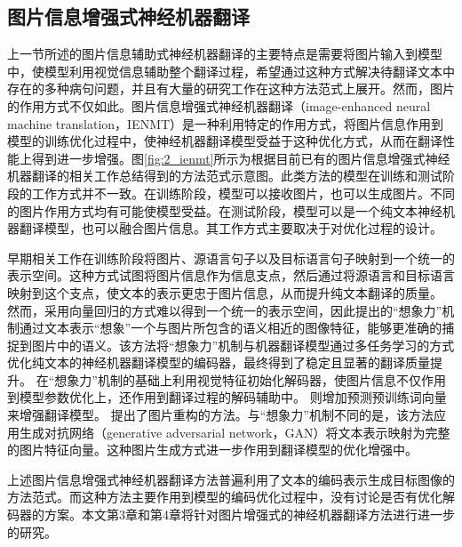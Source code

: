 \subsection{图片信息增强式神经机器翻译}

上一节所述的图片信息辅助式神经机器翻译的主要特点是需要将图片输入到模型中，使模型利用视觉信息辅助整个翻译过程，希望通过这种方式解决待翻译文本中存在的多种病句问题，并且有大量的研究工作在这种方法范式上展开。然而，图片的作用方式不仅如此。图片信息增强式神经机器翻译（image-enhanced neural machine translation，IENMT）是一种利用特定的作用方式，将图片信息作用到模型的训练优化过程中，使神经机器翻译模型受益于这种优化方式，从而在翻译性能上得到进一步增强。图\ref{fig:2_ienmt}所示为根据目前已有的图片信息增强式神经机器翻译的相关工作总结得到的方法范式示意图。此类方法的模型在训练和测试阶段的工作方式并不一致。在训练阶段，模型可以接收图片，也可以生成图片。不同的图片作用方式均有可能使模型受益。在测试阶段，模型可以是一个纯文本神经机器翻译模型，也可以融合图片信息。其工作方式主要取决于对优化过程的设计。

早期相关工作在训练阶段将图片、源语言句子以及目标语言句子映射到一个统一的表示空间。这种方式试图将图片信息作为信息支点，然后通过将源语言和目标语言映射到这个支点，使文本的表示更忠于图片信息，从而提升纯文本翻译的质量。
然而，采用向量回归的方式难以得到一个统一的表示空间，因此提出的“想象力”机制通过文本表示“想象”一个与图片所包含的语义相近的图像特征，能够更准确的捕捉到图片中的语义。该方法将“想象力”机制与机器翻译模型通过多任务学习的方式优化纯文本的神经机器翻译模型的编码器，最终得到了稳定且显著的翻译质量提升。
在“想象力”机制的基础上利用视觉特征初始化解码器，使图片信息不仅作用到模型参数优化上，还作用到翻译过程的解码辅助中。
则增加预测预训练词向量来增强翻译模型。
提出了图片重构的方法。与“想象力”机制不同的是，该方法应用生成对抗网络（generative adversarial network，GAN）将文本表示映射为完整的图片特征向量。这种图片生成方式进一步作用到翻译模型的优化增强中。

上述图片信息增强式神经机器翻译方法普遍利用了文本的编码表示生成目标图像的方法范式。而这种方法主要作用到模型的编码优化过程中，没有讨论是否有优化解码器的方案。本文第3章和第4章将针对图片增强式的神经机器翻译方法进行进一步的研究。